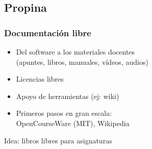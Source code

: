 \documentclass[17pt,aspectratio=169]{beamer}
\renewcommand{\secimage}{figs/bookpages}
\newcommand{\secimage}{figs/bookpages}
\begin{document}
\renewcommand{\secimage}{figs/tipjar}
{\bf
  \textcolor[rgb]{1,1,1}{
    \section{Propina}
  }
}


\begin{frame}
\frametitle{Documentación libre}

\begin{itemize}
\item Del software a los materiales docentes \\
  (apuntes, libros, manuales, vídeos, audios)
\item Licencias libres
\item Apoyo de herramientas (ej: wiki)
\item Primeros pasos en gran escala: \\
  OpenCourseWare (MIT), Wikipedia
\end{itemize}

{\Large
\begin{center}
Idea: libros libres para asignaturas
\end{center}
}

\end{frame}

\end{document}
